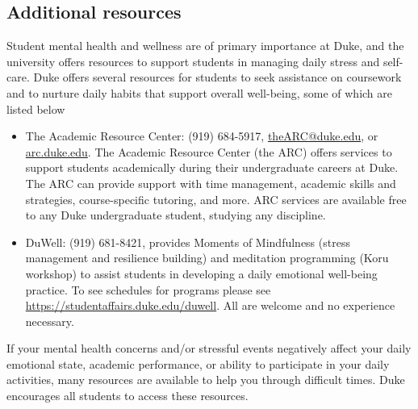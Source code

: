 \documentclass[
  12pt,
  letterpaper,
  DIV=11,
  numbers=noendperiod]{scrartcl}
\begin{document}
\subsection{Additional resources}\label{additional-resources}

Student mental health and wellness are of primary importance at Duke,
and the university offers resources to support students in managing
daily stress and self-care. Duke offers several resources for students
to seek assistance on coursework and to nurture daily habits that
support overall well-being, some of which are listed below

\begin{itemize}
\item
  The Academic Resource Center: (919) 684-5917, \url{theARC@duke.edu},
  or \href{https://arc.duke.edu}{arc.duke.edu}. The Academic Resource
  Center (the ARC) offers services to support students academically
  during their undergraduate careers at Duke. The ARC can provide
  support with time management, academic skills and strategies,
  course-specific tutoring, and more. ARC services are available free to
  any Duke undergraduate student, studying any discipline.
\item
  DuWell: (919) 681-8421, provides Moments of Mindfulness (stress
  management and resilience building) and meditation programming (Koru
  workshop) to assist students in developing a daily emotional
  well-being practice. To see schedules for programs please see
  \url{https://studentaffairs.duke.edu/duwell}. All are welcome and no
  experience necessary.
\end{itemize}

If your mental health concerns and/or stressful events negatively affect
your daily emotional state, academic performance, or ability to
participate in your daily activities, many resources are available to
help you through difficult times. Duke encourages all students to access
these resources.
\end{document}
